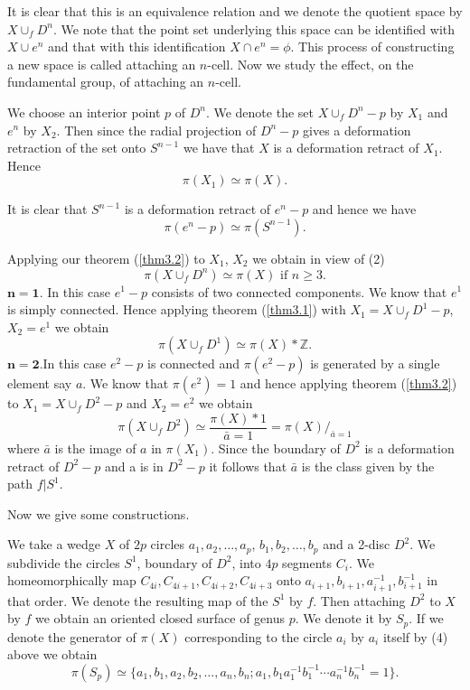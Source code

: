    It is clear that this is an equivalence relation and we denote the
   quotient space by $X \cup_f D^n$. We note that the point set
   underlying this space can be identified with $X \cup e^n$ and that
   with this identification $X \cap e^n = \phi$. This process of
   constructing a new space is called attaching an $n$-cell. Now we
   study the effect, on the fundamental group, of attaching an
   $n$-cell. 
   
   We choose an interior point $p$ of $D^n$. We denote the set $X
   \cup_f D^n - p$ by  $X_1$ and $e^n$ by $X_2$. Then since the radial
   projection of $D^n-p$ gives a deformation retraction of the set
   onto $S^{n-1}$ we have that $X$ is a deformation retract of
   $X_1$. Hence 
   $$
   \pi (X_1) \simeq \pi (X).
   $$
   
It is clear that $S^{n-1}$ is a deformation retract of $e^n -p$ and
hence we have   
   $$
   \pi (e^n -p ) \simeq  \pi (S^{n-1}).
   $$
   
   Applying our theorem (\ref{thm3.2}) to $X_1$, $X_2$ we obtain in view of (2) 
   $$
   \pi (X \cup_f D^n) \simeq \pi (X) \text{ if } n \ge 3.
   $$
$\boldsymbol{n=1}$. In this case $e^1 -p$ consists of two connected
   components. We know that $e^1$ is simply connected. Hence applying theorem
   (\ref{thm3.1}) with $X_1= X \cup_f D^1-p$, $X_2 = e^1$ we obtain 
$$
\pi (X \cup_f D^1) \simeq \pi (X) \ast \mathbb{Z}. 
$$
$\boldsymbol{n=2}$.\pageoriginale In this case $e^2-p$ is connected
and $\pi (e^2 -p)$ is generated by a single  element say $a$. We know that
$\pi (e^2) =1$ and hence applying theorem (\ref{thm3.2}) to $X_1 = X \cup_f
D^2 -p$ and $X_2 = e^2$ we obtain 
$$
\pi (X \cup_f D^2) \simeq \frac{\pi (X) \ast 1}{\bar{a} =1} = \pi
(X) /_{\bar{a} =1} 
$$
where $\bar{a}$ is the image of $a$ in $\pi(X_1)$. Since the
boundary of $D^2$ is a deformation retract of $D^2-p$ and a is in
$D^2-p$ it follows that $\bar{a}$ is the class given by the path
$f|S^1$.  

\medskip
{}

Now we give some constructions.

We take a wedge $X$ of $2p$ circles $a_1, a_2,  \ldots, a_p$, $b_1,
b_2, \ldots, b_p$ and a 2-disc $D^2$. We subdivide the circles
$S^1$, boundary of  $D^2$, into $4p$ segments $C_i$. We
homeomorphically map $C_{4i}, C_{4i+1}, C_{4i+2}, C_{4i+3}$ onto
$a_{i+1}, b_{i+1}, a^{-1}_{i+1}, b^{-1}_{i+1}$ in that
order. We denote the resulting map of the $S^1$ by $f$. Then attaching
$D^2$ to $X$ by $f$ we obtain an oriented closed surface of genus
$p$. We denote it by $S_p$. If we denote the generator of $\pi (X)$
corresponding to the circle $a_i$ by $a_i$ itself by (4) above we
obtain  
$$
\pi (S_p) \simeq \{ a_1,  b_1, a_2,b_2, \ldots, a_n, b_n ; a_1, b_1
a_1^{-1} b^{-1}_1 \cdots a^{-1}_n b^{-1}_n =1\}. 
$$


